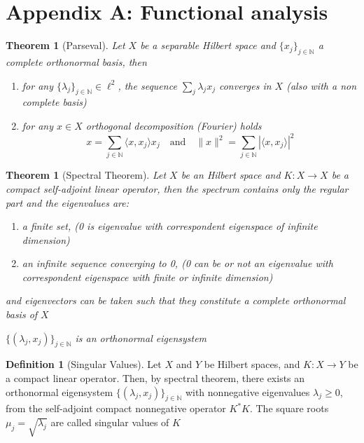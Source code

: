\documentclass[10pt, a4paper, twoside, openright]{book}
\theoremstyle{definition}
\newtheorem{definition}[subsection]{Definition}
\theoremstyle{plain}
\newtheorem{theorem}[subsection]{Theorem}
\theoremstyle{plain}
\theoremstyle{plain}
\theoremstyle{plain}
\theoremstyle{plain}
\theoremstyle{plain}
\theoremstyle{plain}
\theoremstyle{plain}
\begin{document}
\clearpage

\section{Appendix A: Functional analysis}
\begin{theorem}[Parseval]
 Let $X$ be a separable Hilbert space and $\{x_j\}_{j\in\mathbb{N}}$ a complete orthonormal basis, then
 \begin{enumerate}
  \item for any $\{\lambda_j\}_{j\in\mathbb{N}} \in \ell ^2$, the sequence $\sum_{j}\lambda_jx_j$ converges in $X$ (also with a non complete basis)
  \item for any $x \in X$ orthogonal decomposition (Fourier) holds
  \begin{equation}
   x = \sum_{j \in \mathbb{N}} \langle x, x_j\rangle x_j \quad \text{and} \quad \|x\|^2=\sum_{j \in \mathbb{N}} |\langle x, x_j\rangle|^2
  \end{equation}
 \end{enumerate}
\end{theorem}

\begin{theorem}[Spectral Theorem]
 Let $X$ be an Hilbert space and $K:X\to X$ be a compact self-adjoint linear operator, then the spectrum contains only the regular part and the eigenvalues are:
 \begin{enumerate}
  \item a finite set, (0 is eigenvalue with correspondent eigenspace of infinite dimension)
  \item an infinite sequence converging to 0, (0 can be or not an eigenvalue with correspondent eigenspace with finite or infinite dimension)
 \end{enumerate}
 and eigenvectors can be taken such that they constitute a complete orthonormal basis of $X$
 \begin{center}
  $\{(\lambda_j, x_j)\}_{j\in\mathbb{N}}$ is an orthonormal eigensystem
 \end{center}
\end{theorem}

\begin{definition}[Singular Values]
 Let $X$ and $Y$ be Hilbert spaces, and $K:X\to Y$ be a compact linear operator. Then, by spectral theorem, there exists an orthonormal eigensystem $\{(\lambda_j,x_j)\}_{j\in\mathbb{N}}$ with nonnegative eigenvalues $\lambda_j \geq 0$, from the self-adjoint compact nonnegative operator $K^*K$. The square roots $\mu_j = \sqrt{\lambda_j}$ are called singular values of $K$
\end{definition}
\end{document}
